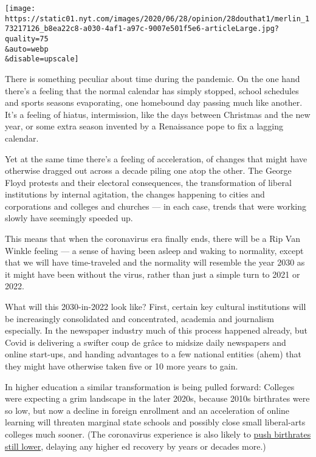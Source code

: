 \texttt{[image: https://static01.nyt.com/images/2020/06/28/opinion/28douthat1/merlin\_173217126\_b8ea22c8-a030-4af1-a97c-9007e501f5e6-articleLarge.jpg?quality=75\\\&auto=webp\\\&disable=upscale]}

There is something peculiar about time during the pandemic. On the one
hand there's a feeling that the normal calendar has simply stopped,
school schedules and sports seasons evaporating, one homebound day
passing much like another. It's a feeling of hiatus, intermission, like
the days between Christmas and the new year, or some extra season
invented by a Renaissance pope to fix a lagging calendar.

Yet at the same time there's a feeling of acceleration, of changes that
might have otherwise dragged out across a decade piling one atop the
other. The George Floyd protests and their electoral consequences, the
transformation of liberal institutions by internal agitation, the
changes happening to cities and corporations and colleges and churches
--- in each case, trends that were working slowly have seemingly speeded
up.

This means that when the coronavirus era finally ends, there will be a
Rip Van Winkle feeling --- a sense of having been asleep and waking to
normality, except that we will have time-traveled and the normality will
resemble the year 2030 as it might have been without the virus, rather
than just a simple turn to 2021 or 2022.

What will this 2030-in-2022 look like? First, certain key cultural
institutions will be increasingly consolidated and concentrated,
academia and journalism especially. In the newspaper industry much of
this process happened already, but Covid is delivering a swifter coup de
grâce to midsize daily newspapers and online start-ups, and handing
advantages to a few national entities (ahem) that they might have
otherwise taken five or 10 more years to gain.

In higher education a similar transformation is being pulled forward:
Colleges were expecting a grim landscape in the later 2020s, because
2010s birthrates were so low, but now a decline in foreign enrollment
and an acceleration of online learning will threaten marginal state
schools and possibly close small liberal-arts colleges much sooner. (The
coronavirus experience is also likely to
\href{https://www.brookings.edu/research/half-a-million-fewer-children-the-coming-covid-baby-bust/}{push
birthrates still lower}, delaying any higher ed recovery by years or
decades more.)

